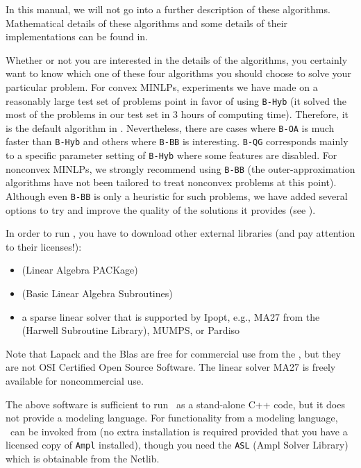 In this manual,  we will not go into a further description of these algorithms.
Mathematical details of these algorithms 
and some details of their implementations can be found in.

Whether or not you are interested in the details of the algorithms, you certainly
want to know which one of these four algorithms you should choose to solve
your particular problem.
For convex MINLPs, experiments we have made on a reasonably large test set of problems point in favor of using {\tt B-Hyb}
(it solved the most of the problems in our test set in 3 hours of computing time).
Therefore, it is the default algorithm in \Bonmin.
Nevertheless, there are cases where {\tt B-OA} is much faster than {\tt B-Hyb} and others where {\tt B-BB} is interesting.
{\tt B-QG} corresponds mainly to a specific parameter setting of {\tt B-Hyb} where some features are disabled.
For nonconvex MINLPs, we strongly recommend using {\tt B-BB} (the outer-approximation algorithms
have not been tailored to treat nonconvex problems at this point). Although even {\tt B-BB} is only a
heuristic for such problems, we have added several
options to try and improve the quality of the solutions it provides (see ).

In order to run {\Bonmin}, you have to download other external
libraries (and pay attention to their licenses!):
\begin{itemize}
\item {} (Linear Algebra
PACKage)
\item {} (Basic Linear Algebra
Subroutines)
\item a sparse linear solver that is supported by Ipopt, e.g., MA27 from the
(Harwell Subroutine Library), MUMPS, or Pardiso
\end{itemize}

Note that Lapack and the Blas are free for commercial use from the
, but they are
not OSI Certified Open Source Software. The linear solver MA27 is
freely available for noncommercial use.

The above software is sufficient to run \Bonmin\ as a
stand-alone C++ code, but it does not provide a modeling language.
For functionality from a modeling language, \Bonmin\ can be
invoked from  (no extra installation is required provided
that you have a licensed copy of {\tt Ampl} installed), though you
need the {\tt ASL} (Ampl Solver Library) which is obtainable from the Netlib.

